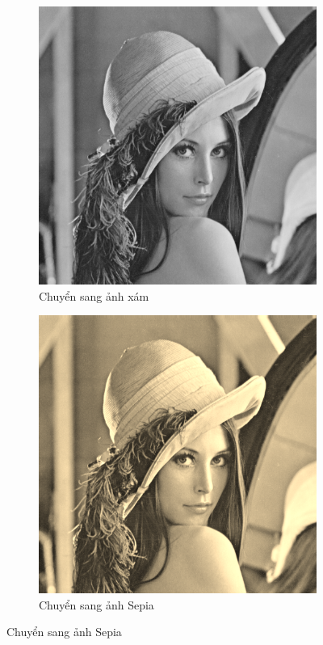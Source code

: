 \documentclass[]{article}
\begin{document}
\pagebreak
\begin{figure}[!ht]
  \begin{subfigure}[b]{0.45\linewidth}
    \includegraphics[width=\linewidth]{image/Lenna_grayscale.png}
    \caption{Chuyển sang ảnh xám}
  \end{subfigure}
  \begin{subfigure}[b]{0.45\linewidth}
    \includegraphics[width=\linewidth]{image/Lenna_sepia.png}
    \caption{Chuyển sang ảnh Sepia}
  \end{subfigure}
\end{figure}
\end{document}
